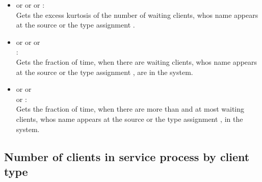 \begin{itemize}
\item
{} or  or  or :\\
Gets the excess kurtosis of the number of waiting clients, whos name appears at the source or the type assignment .

\item
{} or  or  or\\ :\\
Gets the fraction of time, when there are  waiting clients, whos name appears at the source or the type assignment , are in the system.

\item
{} or  or\\  or :\\
Gets the fraction of time, when there are more than  and at most  waiting clients, whos name appears at the source or the type assignment , in the system.

\end{itemize}



\subsection{Number of clients in service process by client type}

